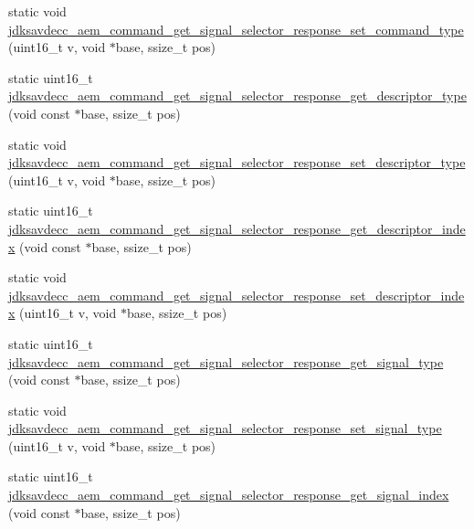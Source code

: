 \begin{DoxyCompactItemize}
\item 
static void \hyperlink{group__command__get__signal__selector__response_gae12cad22479e45ba6433d12a7a94b3fa}{jdksavdecc\+\_\+aem\+\_\+command\+\_\+get\+\_\+signal\+\_\+selector\+\_\+response\+\_\+set\+\_\+command\+\_\+type} (uint16\+\_\+t v, void $\ast$base, ssize\+\_\+t pos)
\item 
static uint16\+\_\+t \hyperlink{group__command__get__signal__selector__response_ga7901e5fd86199424ef292086f7e7d44d}{jdksavdecc\+\_\+aem\+\_\+command\+\_\+get\+\_\+signal\+\_\+selector\+\_\+response\+\_\+get\+\_\+descriptor\+\_\+type} (void const $\ast$base, ssize\+\_\+t pos)
\item 
static void \hyperlink{group__command__get__signal__selector__response_ga4887f5621f1139b2aad059d215e32e2f}{jdksavdecc\+\_\+aem\+\_\+command\+\_\+get\+\_\+signal\+\_\+selector\+\_\+response\+\_\+set\+\_\+descriptor\+\_\+type} (uint16\+\_\+t v, void $\ast$base, ssize\+\_\+t pos)
\item 
static uint16\+\_\+t \hyperlink{group__command__get__signal__selector__response_gaeda1f10c684fb4899ed11ea05b93626c}{jdksavdecc\+\_\+aem\+\_\+command\+\_\+get\+\_\+signal\+\_\+selector\+\_\+response\+\_\+get\+\_\+descriptor\+\_\+index} (void const $\ast$base, ssize\+\_\+t pos)
\item 
static void \hyperlink{group__command__get__signal__selector__response_gaa14ad43533e407456eb88104445b275f}{jdksavdecc\+\_\+aem\+\_\+command\+\_\+get\+\_\+signal\+\_\+selector\+\_\+response\+\_\+set\+\_\+descriptor\+\_\+index} (uint16\+\_\+t v, void $\ast$base, ssize\+\_\+t pos)
\item 
static uint16\+\_\+t \hyperlink{group__command__get__signal__selector__response_gab22cb037fbb295d3582885e4df0d9d9d}{jdksavdecc\+\_\+aem\+\_\+command\+\_\+get\+\_\+signal\+\_\+selector\+\_\+response\+\_\+get\+\_\+signal\+\_\+type} (void const $\ast$base, ssize\+\_\+t pos)
\item 
static void \hyperlink{group__command__get__signal__selector__response_gac0e03f241a0edfeb9c2584d1b4e328c5}{jdksavdecc\+\_\+aem\+\_\+command\+\_\+get\+\_\+signal\+\_\+selector\+\_\+response\+\_\+set\+\_\+signal\+\_\+type} (uint16\+\_\+t v, void $\ast$base, ssize\+\_\+t pos)
\item 
static uint16\+\_\+t \hyperlink{group__command__get__signal__selector__response_ga249d162fe0b4e8ca2e11d50d8c0e81c7}{jdksavdecc\+\_\+aem\+\_\+command\+\_\+get\+\_\+signal\+\_\+selector\+\_\+response\+\_\+get\+\_\+signal\+\_\+index} (void const $\ast$base, ssize\+\_\+t pos)
\item 

\end{DoxyCompactItemize}
